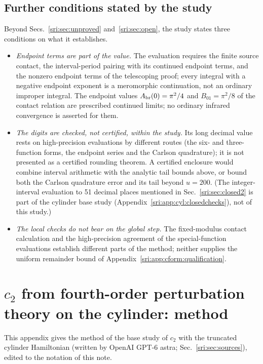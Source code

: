\subsection{Further conditions stated by the study}\label{sri:app:cform:status}
Beyond Secs.~\ref{sri:sec:unproved} and~\ref{sri:sec:open}, the study states three conditions on what it establishes.
\begin{itemize}
\item \emph{Endpoint terms are part of the value.} The evaluation requires the finite source contact, the
 interval-period pairing with its continued endpoint terms, and the nonzero endpoint terms of the telescoping proof;
 every integral with a negative endpoint exponent is a meromorphic continuation, not an ordinary improper integral.
 The endpoint values $A_{\rm br}(0)=\pi^2/4$ and $B_{01}=\pi^2/8$ of the contact relation are prescribed continued
 limits; no ordinary infrared convergence is asserted for them.
\item \emph{The digits are checked, not certified, within the study.} Its long decimal value rests on
 high-precision evaluations by different routes (the six- and three-function forms, the endpoint series and the
 Carlson quadrature); it is not presented as a certified rounding theorem. A certified enclosure would
 combine interval arithmetic with the analytic tail bounds above, or bound both the Carlson quadrature error and its
 tail beyond $u=200$. (The integer-interval evaluation to 51 decimal places mentioned in Sec.~\ref{sri:sec:closed2} is part
 of the cylinder base study (Appendix~\ref{sri:app:cyl:closedchecks}), not of this study.)
\item \emph{The local checks do not bear on the global step.} The fixed-modulus contact calculation and the
 high-precision agreement of the special-function evaluations establish different parts of the method; neither
 supplies the uniform remainder bound of Appendix~\ref{sri:app:cform:qualification}.
\end{itemize}

\section{\texorpdfstring{$c_2$}{c2} from fourth-order perturbation theory on the cylinder: method}\label{sri:app:cyl}
This appendix gives the method of the base study of $c_2$ with the truncated cylinder Hamiltonian (written by OpenAI
GPT-6 astra; Sec.~\ref{sri:sec:sources}), edited to the notation of this note.

